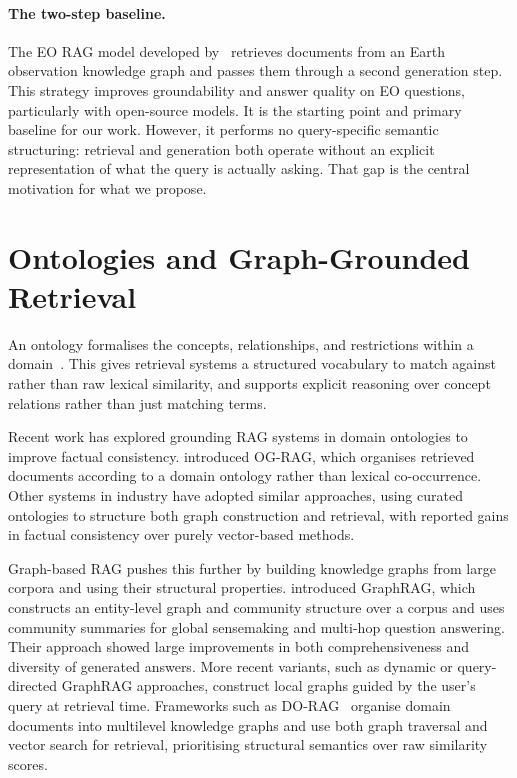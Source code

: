 \paragraph{The two-step baseline.} The EO RAG model developed by~\citet{elbaff2025earthobservationrag} retrieves documents from an Earth observation knowledge graph and passes them through a second generation step. This strategy improves groundability and answer quality on EO questions, particularly with open-source models. It is the starting point and primary baseline for our work. However, it performs no query-specific semantic structuring: retrieval and generation both operate without an explicit representation of what the query is actually asking. That gap is the central motivation for what we propose.

\section{Ontologies and Graph-Grounded Retrieval}
\label{sec:rw-ontologies}

An ontology formalises the concepts, relationships, and restrictions within a domain~\citep{gruber1993ontology}. This gives retrieval systems a structured vocabulary to match against rather than raw lexical similarity, and supports explicit reasoning over concept relations rather than just matching terms.

Recent work has explored grounding RAG systems in domain ontologies to improve factual consistency. \citet{baek2024ograg} introduced OG-RAG, which organises retrieved documents according to a domain ontology rather than lexical co-occurrence. Other systems in industry have adopted similar approaches, using curated ontologies to structure both graph construction and retrieval, with reported gains in factual consistency over purely vector-based methods.

Graph-based RAG pushes this further by building knowledge graphs from large corpora and using their structural properties. \citet{edge2024graphrag} introduced GraphRAG, which constructs an entity-level graph and community structure over a corpus and uses community summaries for global sensemaking and multi-hop question answering. Their approach showed large improvements in both comprehensiveness and diversity of generated answers. More recent variants, such as dynamic or query-directed GraphRAG approaches, construct local graphs guided by the user's query at retrieval time. Frameworks such as DO-RAG~\citep{opoku2025dorag} organise domain documents into multilevel knowledge graphs and use both graph traversal and vector search for retrieval, prioritising structural semantics over raw similarity scores.

